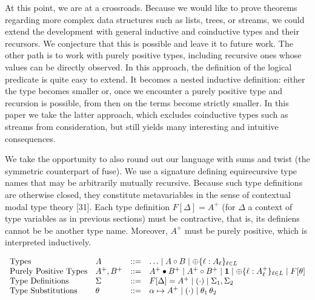 At this point, we are at a crossroads. Because we would like to prove theorems regarding more complex data structures such as lists, trees, or streams, we could extend the development with general inductive and coinductive types and their recursors. We conjecture that this is possible and leave it to future work. The other path is to work with purely positive types, including recursive ones whose values can be directly observed. In this approach, the definition of the logical predicate is quite easy to extend. It becomes a nested inductive definition: either the type becomes smaller or, once we encounter a purely positive type and recursion is possible, from then on the terms become strictly smaller. In this paper we take the latter approach, which excludes coinductive types such as streams from consideration, but still yields many interesting and intuitive consequences.\par
 
 
 
We take the opportunity to also round out our language with sums and twist (the symmetric counterpart of fuse). We use a signature defining equirecursive type names that may be arbitrarily mutually recursive. Because such type definitions are otherwise closed, they constitute metavariables in the sense of contextual modal type theory [31]. Each type definition $F[\Delta]=A^{+}$ (for $\Delta$ a context of type variables as in previous sections) must be contractive, that is, its definiens cannot be be another type name. Moreover, $A^{+}$ must be purely positive, which is interpreted inductively.\par
  
\par  \quad  \[\begin{array}[]{llcll}\mbox{Types}&A&::=&\ldots\mid A\mathbin{\circ}B\mid\oplus\{\ell:A_{\ell}\}_{\ell\in L}\\
\mbox{Purely Positive Types}&A^{+},B^{+}&::=&A^{+}\bullet B^{+}\mid A^{+}\mathbin{\circ}B^{+}\mid\mathbf{1}\mid\oplus\{\ell:A_{\ell}^{+}\}_{\ell\in L}\mid F[\theta]\\
\mbox{Type Definitions}&\Sigma&::=&F[\Delta]=A^{+}\mid(\cdot)\mid\Sigma_{1},\Sigma_{2}\\
\mbox{Type Substitutions}&\theta&::=&\alpha\mapsto A^{+}\mid(\cdot)\mid\theta_{1}\,\theta_{2}\\[10.00002pt]
\end{array}\]\quad  \quad  
  

